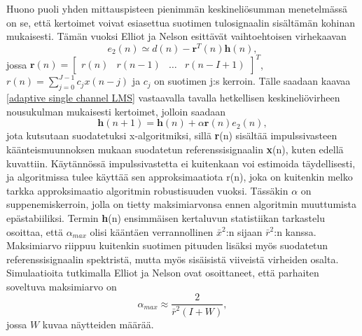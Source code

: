 \documentclass[finnish,12pt]{article}
\begin{document}
Huono puoli yhden mittauspisteen pienimmän keskineliösumman menetelmässä on se, että kertoimet voivat esiasettua suotimen tulosignaalin sisältämän kohinan mukaisesti. Tämän vuoksi Elliot ja Nelson \cite{S.J.Elliot1989} esittävät vaihtoehtoisen virhekaavan \begin{equation}
e_2(n) \simeq d(n) - \textbf{r}^T(n) \textbf{h}(n),
\end{equation} jossa
\newline
$\textbf{r}(n) = \begin{bmatrix}
r(n) & r(n-1) & \hdots & r(n-I+1)
\end{bmatrix}^T$,
\newline
$r(n) = \sum\limits_{j=0}^{J-1} c_j x(n-j)$ ja
\newline
$c_j$ on suotimen j:s kerroin.
\newline
Tälle saadaan kaavaa \eqref{adaptive single channel LMS} vastaavalla tavalla hetkellisen keskineliövirheen nousukulman mukaisesti kertoimet, jolloin saadaan \begin{equation}  \label{adaptive single channel LMS filtered}
\textbf{h}(n+1) = \textbf{h}(n) + \alpha \textbf{r}(n) e_2(n),
\end{equation} jota kutsutaan suodatetuksi x-algoritmiksi, sillä \textbf{r}(n) sisältää impulssivasteen käänteismuunnoksen mukaan suodatetun referenssisignaalin \textbf{x}(n), kuten edellä kuvattiin. Käytännössä impulssivastetta ei kuitenkaan voi estimoida täydellisesti, ja algoritmissa tulee käyttää sen approksimaatiota r(n), joka on kuitenkin melko tarkka approksimaatio algoritmin robustisuuden vuoksi. Tässäkin $\alpha$ on suppenemiskerroin, jolla on tietty maksimiarvonsa ennen algoritmin muuttumista epästabiiliksi. Termin \textbf{h}(n) ensimmäisen kertaluvun statistiikan tarkastelu osoittaa, että $\alpha_{max}$ olisi kääntäen verrannollinen $\bar{x}^2$:n sijaan $\bar{r}^2$:n kanssa. Maksimiarvo riippuu kuitenkin suotimen pituuden lisäksi myös suodatetun referenssisignaalin spektristä, mutta myös sisäisistä viiveistä virheiden osalta. Simulaatioita tutkimalla Elliot ja Nelson ovat osoittaneet, että parhaiten soveltuva maksimiarvo on \begin{equation}
\alpha_{max} \approx \frac{2}{\bar{r}^2 (I + W)},
\end{equation} jossa $W$ kuvaa näytteiden määrää. \cite{S.J.Elliot1989}
\end{document}
